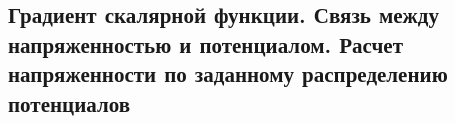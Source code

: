 \subsection{Градиент скалярной функции. Связь между напряженностью и потенциалом. Расчет напряженности по заданному распределению потенциалов}